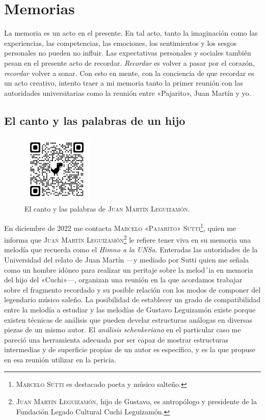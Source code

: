\chapter{Memorias}
\label{cap:memorias}

La memoria es un acto en el presente. En tal acto, tanto la imaginación como las experiencias, las competencias, las emociones, los sentimientos y los sesgos personales no pueden no influir. Las expectativas personales y sociales también pesan en el presente acto de recordar. \emph{Recordar} es volver a pasar por el corazón, \emph{recordar} volver a sonar. Con esto en mente, con la conciencia de que recordar es un acto creativo, intento traer a mi memoria tanto la primer reunión con las autoridades universitarias como la reunión entre «Pajarito», Juan Martín y yo.


\section{El canto y las palabras de un hijo}
\label{sec:palabra-canto}

\begin{figure}[H]
\centering
\includegraphics[width=0.3\textwidth]{img/qrcode-himno-memoria}
\caption{El canto y las palabras de \textsc{Juan Martín Leguizamón}.}
\label{fig:canto-palabras}
\end{figure}


En diciembre de 2022 me contacta \textsc{Marcelo «Pajarito» Sutti}\footnote{\textsc{Marcelo Sutti} es destacado poeta y músico salteño.}, quien me informa que \textsc{Juan Martín Leguizamón}\footnote{\textsc{Juan Martín Leguizamón}, hijo de Gustavo, es antropólogo y presidente de la Fundación Legado Cultural Cuchi Leguizamón.} le refiere tener viva en su memoria una melodía que recuerda como el \emph{Himno a la UNSa}. Enteradas las autoridades de la Universidad del relato de Juan Martín ---y mediado por Sutti quien me señala como un hombre idóneo para realizar un peritaje sobre la melod´ia en memoria del hijo del «Cuchi»---, organizan una reunión en la que acordamos trabajar sobre el fragmento recordado y su posible relación con los modos de componer del legendario músico saleño. La posibilidad de establecer un grado de compatibilidad entre la melodía a estudiar y las melodías de Gustavo Leguizamón existe porque existen técnicas de análisis que pueden develar estructuras análogas en diversas piezas de un mismo autor. El \emph{análisis schenkeriano} en el particular caso me pareció una herramienta adecuada por ser capaz de mostrar estructuras intermedias y de superficie propias de un autor es específico, y es la que propuse en esa reunión utilizar en la pericia.

